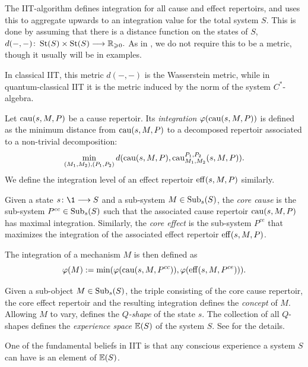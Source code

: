 The IIT-algorithm defines integration for all cause and effect repertoirs, and uses this to aggregate upwards to an integration value for the total system $S$. This is done by assuming that there is a distance function on the states of $S$, $d(-,-)\colon \operatorname{St}(S)\times \operatorname{St}(S) \longrightarrow \mathbb{R}_{\geqslant 0}.$
As in \citeme, we do not require this to be a metric, though it usually will be in examples. 

\begin{remark}
    In classical IIT, this metric $d(-,-)$ is the Wasserstein metric, while in quantum-classical IIT it is the metric induced by the norm of the system $C^*$-algebra.
\end{remark} 

\begin{definition}
    Let $\mathrm{cau}(s,M,P)$ be a cause repertoir. Its \emph{integration} $\varphi(\mathrm{cau}(s,M,P))$ is defined as the minimum distance from $\mathrm{cau}(s,M,P)$ to a decomposed repertoir associated to a non-trivial decomposition: 
    \[\min_{(M_1, M_2), (P_1, P_2)} d(\mathrm{cau}(s,M,P), \mathrm{cau}_{M_1, M_2}^{P_1, P_2}(s,M,P)).\]
    We define the integration level of an effect repertoir $\mathrm{eff}(s,M,P)$ similarly. 
\end{definition}

\begin{definition}
    Given a state $s\:\1\to S$ and a sub-system $M\in \operatorname{Sub}_s(S)$, the \emph{core cause} is the sub-system $P^{cc}\in \operatorname{Sub}_s(S)$ such that the associated cause repertoir $\mathrm{cau}(s,M,P)$ has maximal integration. Similarly, the \emph{core effect} is the sub-system $P^{ce}$ that maximizes the integration of the associated effect repertoir $\mathrm{eff}(s,M,P)$.    
\end{definition}

\begin{definition}
    The integration of a mechanism $M$ is then defined as 
    $$\varphi(M) := \min(\varphi(\mathrm{cau}(s,M,P^{cc})), \varphi(\mathrm{eff}(s,M,P^{ce}))).$$
\end{definition}

Given a sub-object $M\in \operatorname{Sub}_s(S)$, the triple consisting of the core cause repertoir, the core effect repertoir and the resulting integration defines the \emph{concept} of $M$. Allowing $M$ to vary, defines the \emph{$Q$-shape} of the state $s$. The collection of all $Q$-shapes defines the \emph{experience space} $\mathbb{E}(S)$ of the system $S$. See \citeme for the details. 

\begin{remark}
    One of the fundamental beliefs in IIT is that any conscious experience a system $S$ can have is an element of $\mathbb{E}(S)$. 
\end{remark}

